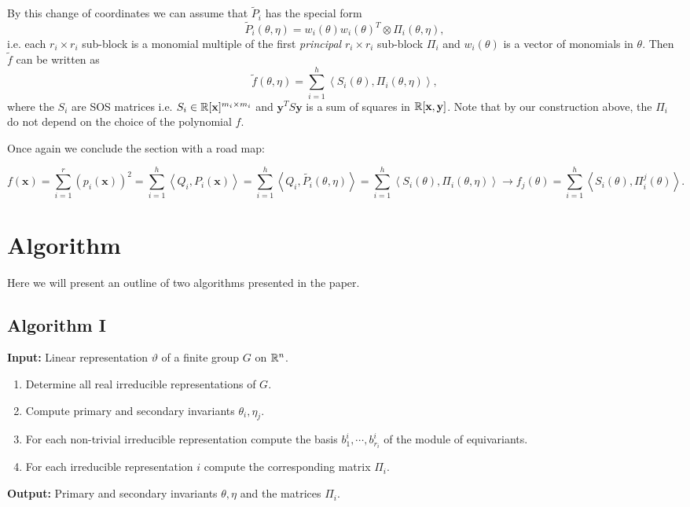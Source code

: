 \documentclass[]{article}
\begin{document}
By this change of coordinates we can assume that $\tilde{P}_i$ has the special form 
\[
    \tilde{P}_i(\theta,\eta) = w_i(\theta) w_i(\theta)^T \otimes \Pi_i(\theta,\eta),
\]
i.e. each $r_i\times r_i$ sub-block is a monomial multiple of the first \textit{principal} $r_i\times r_i$ sub-block $\Pi_i$ and $w_i(\theta)$ is a vector of monomials in $\theta$. Then $\tilde{f}$ can be written as 
\[
    \tilde{f}(\theta, \eta)=\sum_{i=1}^h\left<S_i(\theta),\Pi_i(\theta,\eta)\right>,
\]
where the $S_i$ are SOS matrices i.e. $S_i\in \mathbb R[\mathbf{x}]^{m_i\times m_i}$ and $\mathbf{y}^TS\textbf{y}$ 
is a sum of squares in $\mathbb R[\textbf{x},\textbf{y}]$. Note that by our construction above, the $\Pi_i$ do not depend on the choice of the polynomial $f$.

Once again we conclude the section with a road map:

\[f(\mathbf{x}) = \sum_{i= 1}^{r} (p_i(\mathbf{x}))^2 
                = \sum_{i=1}^{h}\left<Q_i,P_i(\mathbf{x})\right> 
                = \sum_{i=1}^{h}\left<Q_i,\tilde{P_i}(\theta,\eta)\right>
                = \sum_{i=1}^{h}\left<S_i(\theta),\Pi_i(\theta,\eta)\right> 
                \rightarrow f_j(\theta) = \sum_{i=1}^{h}\left<S_i(\theta),\Pi_i^j(\theta)\right> . \]

\section*{Algorithm}
Here we will present an outline of two algorithms presented in the paper.
\subsection*{Algorithm I}


\textbf{Input:} Linear representation $\vartheta$ of a finite group $G$ on $\mathbb R^n$.

\begin{enumerate}
    \item Determine all real irreducible representations of $G$.
    \item Compute primary and secondary invariants $\theta_i,\eta_j$. 
    \item For each non-trivial irreducible representation compute the basis $b_1^i,\cdots, b_{r_i}^i$ of the module of equivariants.
    \item For each irreducible representation $i$ compute the corresponding matrix $\Pi_i$.
\end{enumerate}
\noindent
\textbf{Output:} Primary and secondary invariants $\theta,\eta$ and the matrices $\Pi_i$.
\end{document}
